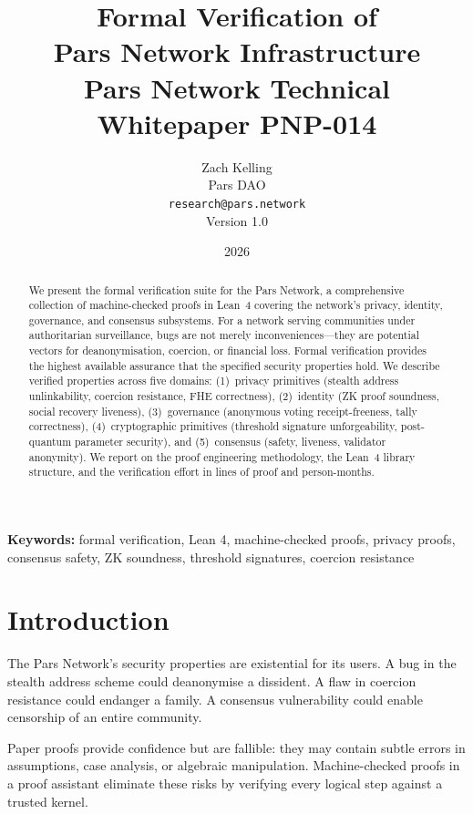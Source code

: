 \documentclass[11pt,a4paper]{article}
\title{%
    \textbf{Formal Verification of\\
    Pars Network Infrastructure}\\[0.5em]
    \large Pars Network Technical Whitepaper PNP-014
}
\author{%
    Zach Kelling\\
    Pars DAO\\
    \texttt{research@pars.network}\\[0.5em]
    \small Version 1.0
}
\date{2026}
\begin{document}
\parscoverpage

\thispagestyle{fancy}

\begin{abstract}
\noindent
We present the formal verification suite for the Pars Network, a
comprehensive collection of machine-checked proofs in Lean~4 covering
the network's privacy, identity, governance, and consensus subsystems.
For a network serving communities under authoritarian surveillance, bugs
are not merely inconveniences---they are potential vectors for
deanonymisation, coercion, or financial loss.  Formal verification
provides the highest available assurance that the specified security
properties hold.  We describe verified properties across five domains:
(1)~privacy primitives (stealth address unlinkability, coercion
resistance, FHE correctness), (2)~identity (ZK proof soundness, social
recovery liveness), (3)~governance (anonymous voting receipt-freeness,
tally correctness), (4)~cryptographic primitives (threshold signature
unforgeability, post-quantum parameter security), and (5)~consensus
(safety, liveness, validator anonymity).  We report on the proof
engineering methodology, the Lean~4 library structure, and the
verification effort in lines of proof and person-months.
\end{abstract}

\vspace{1em}
\noindent\textbf{Keywords:} formal verification, Lean 4, machine-checked
proofs, privacy proofs, consensus safety, ZK soundness, threshold
signatures, coercion resistance

\tableofcontents
\newpage

\section{Introduction}
\label{sec:intro}

The Pars Network's security properties are existential for its users.
A bug in the stealth address scheme could deanonymise a dissident.  A
flaw in coercion resistance could endanger a family.  A consensus
vulnerability could enable censorship of an entire community.

Paper proofs provide confidence but are fallible: they may contain
subtle errors in assumptions, case analysis, or algebraic manipulation.
Machine-checked proofs in a proof assistant eliminate these risks by
verifying every logical step against a trusted kernel.
\end{document}
